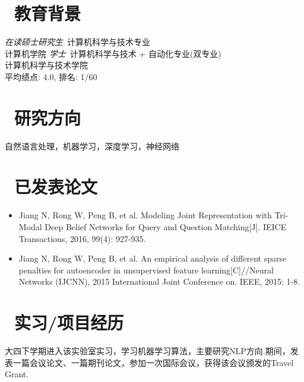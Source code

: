 \documentclass{resume}
\begin{document}



\section{\faGraduationCap\  教育背景}
\textit{在读硕士研究生}\ 计算机科学与技术专业 \\
计算机学院
\textit{学士}\ 计算机科学与技术 + 自动化专业(双专业)\\
计算机科学与技术学院 \\
平均绩点: 4.0, 排名: 1/60

\section{\faLightbulbO\ 研究方向}
自然语言处理，机器学习，深度学习，神经网络

\section{\faBook\ 已发表论文}
\begin{itemize}[parsep=0.5ex]
\item Jiang N, Rong W, Peng B, et al. Modeling Joint Representation with Tri-Modal Deep Belief Networks for Query and Question Matching[J]. IEICE Transactions, 2016, 99(4): 927-935.

\item Jiang N, Rong W, Peng B, et al. An empirical analysis of different sparse penalties for autoencoder in unsupervised feature learning[C]//Neural Networks (IJCNN), 2015 International Joint Conference on. IEEE, 2015: 1-8.
\end{itemize}

\section{\faUsers\ 实习/项目经历}
大四下学期进入该实验室实习，学习机器学习算法，主要研究NLP方向.期间，发表一篇会议论文、一篇期刊论文，参加一次国际会议，获得该会议颁发的Travel Grant.
\end{document}
